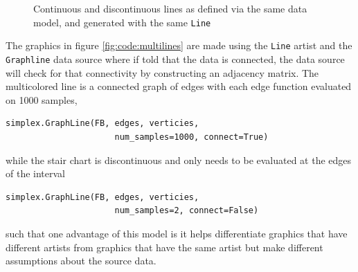 \documentclass[journal]{vgtc}                %
\begin{document}
\begin{figure}[htb]
  \centering 
\caption{Continuous and discontinuous lines as defined via the same data model, and generated with the same \vartisteq \texttt{Line}}
\label{fig:code:multilines}
\end{figure}
The graphics in figure \autoref{fig:code:multilines} are made using the \texttt{Line} artist and the \texttt{Graphline} data source where if told that the data is connected, the data source will check for that connectivity by constructing an adjacency matrix. The multicolored line is a connected graph of edges with each edge function evaluated on 1000 samples, 
\begin{verbatim}
simplex.GraphLine(FB, edges, verticies, 
                      num_samples=1000, connect=True)
\end{verbatim}
while the stair chart is discontinuous and only needs to be evaluated at the edges of the interval 
\begin{verbatim}
simplex.GraphLine(FB, edges, verticies, 
                      num_samples=2, connect=False)
\end{verbatim}
such that one advantage of this model is it helps differentiate graphics that have different artists from graphics that have the same artist but make different assumptions about the source data. 
\end{document}
